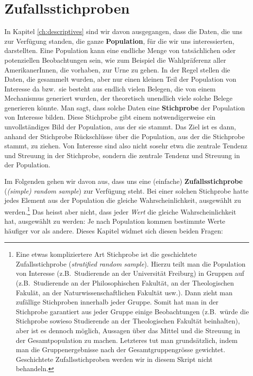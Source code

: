 \documentclass[oneside, 10pt]{book}\usepackage[]{graphicx}\usepackage[]{xcolor}
\begin{document}
\chapter{Zufallsstichproben}\label{ch:stichproben}

In Kapitel \ref{ch:descriptives} sind wir davon
ausgegangen, dass die Daten, die uns zur Verfügung
standen, die ganze \textbf{Population}, für die wir uns
interessierten, darstellten. 
Eine Population kann eine endliche Menge von tatsächlichen
oder potenziellen Beobachtungen sein, wie zum Beispiel
die Wahlpräferenz aller AmerikanerInnen, die vorhaben, 
zur Urne zu gehen.
In der Regel stellen die Daten,
die gesammelt wurden, aber nur einen kleinen Teil
der Population von Interesse da bzw.\ sie besteht aus
endlich vielen Belegen, die von einem Mechanismus
generiert wurden, der theoretisch unendlich viele solche
Belege generieren könnte.
Man sagt, dass solche Daten eine \textbf{Stichprobe}
der Population von Interesse bilden.
Diese Stichprobe gibt einem notwendigerweise ein 
unvollständiges Bild der Population, aus der sie stammt.
Das Ziel ist es dann,
anhand der Stichprobe Rückschlüsse über die
Population, aus der die Stichprobe stammt, zu ziehen.
Von Interesse sind also nicht sosehr etwa die zentrale Tendenz
und Streuung in der Stichprobe, sondern die
zentrale Tendenz und Streuung in der Population.

Im Folgenden gehen wir davon aus, dass uns eine 
(einfache) \textbf{Zufallsstichprobe} (\textit{(simple) random sample}) zur Verfügung steht.
Bei einer solchen Stichprobe hatte jedes Element aus der Population
die gleiche Wahrscheinlichkeit, ausgewählt zu werden.\footnote{Eine etwas
kompliziertere Art Stichprobe ist die geschichtete Zufallsstichprobe
(\textit{stratified random sample}).
Hierzu teilt man die Population von Interesse (z.B.\ Studierende
an der Universität Freiburg) in Gruppen auf (z.B.\ Studierende an der
Philosophischen Fakultät, an der Theologischen Fakulät, an der
Naturwissenschaftlichen Fakultät usw.). Dann zieht man zufällige
Stichproben innerhalb jeder Gruppe. Somit hat man in
der Stichprobe garantiert aus jeder Gruppe einige Beobachtungen
(z.B.\ würde die Stichprobe sowieso Studierende an der Theologischen
Fakultät beinhalten), aber ist es dennoch möglich, Aussagen über
das Mittel und die Streuung in der Gesamtpopulation zu machen.
Letzteres tut man grundsätzlich, indem man die Gruppenergebnisse nach
der Gesamtgruppengrösse gewichtet. Geschichtete Zufallsstichproben
werden wir in diesem Skript nicht behandeln.}
Das heisst aber nicht, dass jeder \emph{Wert} die gleiche Wahrscheinlichkeit
hat, ausgewählt zu werden: Je nach Population kommen bestimmte Werte
häufiger vor als andere.
Dieses Kapitel widmet sich diesen beiden Fragen:
\end{document}
